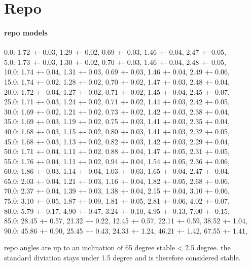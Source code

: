 \section{Repo}
% 
\paragraph{repo models}
% 
0.0:     1.72 +- 0.03, 1.29 +- 0.02, 0.69 +- 0.03, 1.46 +- 0.04, 2.47 +- 0.05,\\
5.0:     1.73 +- 0.03, 1.30 +- 0.02, 0.70 +- 0.03, 1.46 +- 0.04, 2.48 +- 0.05,\\
10.0:    1.74 +- 0.04, 1.31 +- 0.03, 0.69 +- 0.03, 1.46 +- 0.04, 2.49 +- 0.06,\\
15.0:    1.74 +- 0.02, 1.28 +- 0.02, 0.70 +- 0.02, 1.47 +- 0.03, 2.48 +- 0.04,\\
20.0:    1.72 +- 0.04, 1.27 +- 0.02, 0.71 +- 0.02, 1.45 +- 0.04, 2.45 +- 0.07,\\
25.0:    1.71 +- 0.03, 1.24 +- 0.02, 0.71 +- 0.02, 1.44 +- 0.03, 2.42 +- 0.05,\\
30.0:    1.69 +- 0.02, 1.21 +- 0.02, 0.73 +- 0.02, 1.42 +- 0.03, 2.38 +- 0.04,\\
35.0:    1.69 +- 0.03, 1.19 +- 0.02, 0.75 +- 0.03, 1.41 +- 0.03, 2.35 +- 0.04,\\
40.0:    1.68 +- 0.03, 1.15 +- 0.02, 0.80 +- 0.03, 1.41 +- 0.03, 2.32 +- 0.05,\\
45.0:    1.68 +- 0.03, 1.13 +- 0.02, 0.82 +- 0.03, 1.42 +- 0.03, 2.29 +- 0.04,\\
50.0:    1.71 +- 0.04, 1.11 +- 0.02, 0.88 +- 0.04, 1.47 +- 0.05, 2.31 +- 0.05,\\
55.0:    1.76 +- 0.04, 1.11 +- 0.02, 0.94 +- 0.04, 1.54 +- 0.05, 2.36 +- 0.06,\\
60.0:    1.86 +- 0.03, 1.14 +- 0.04, 1.03 +- 0.03, 1.65 +- 0.04, 2.47 +- 0.04,\\
65.0:    2.03 +- 0.04, 1.21 +- 0.03, 1.16 +- 0.04, 1.82 +- 0.05, 2.68 +- 0.06,\\
70.0:    2.37 +- 0.04, 1.39 +- 0.03, 1.38 +- 0.04, 2.15 +- 0.04, 3.10 +- 0.06,\\
75.0:    3.10 +- 0.05, 1.87 +- 0.09, 1.81 +- 0.05, 2.81 +- 0.06, 4.02 +- 0.07,\\
80.0:    5.79 +- 0.17, 4.90 +- 0.47, 3.24 +- 0.10, 4.95 +- 0.13, 7.00 +- 0.15,\\
85.0:    28.45 +- 0.57, 21.32 +- 0.22, 12.45 +- 0.57, 22.11 +- 0.59, 38.52 +- 1.04,\\
90.0:    45.86 +- 0.90, 25.45 +- 0.43, 24.33 +- 1.24, 46.21 +- 1.42, 67.55 +- 1.41,\\
\par
% 
% 
repo angles are up to an inclination of 65 degree stable < 2.5 degree.
the standard diviation stays under 1.5 degree and is therefore considered stable.
% 

